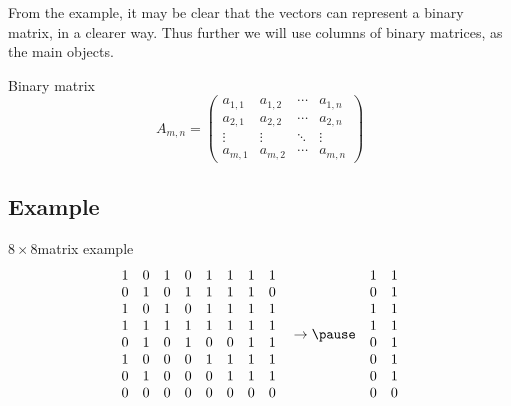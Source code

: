 \documentclass{beamer}
\begin{document}
\begin{frame}
  From the example, it may be clear that the vectors can represent a
  \alert{binary matrix}, in a clearer way. Thus further we will use columns of binary
  matrices, as the main objects.

  \begin{block}{Binary matrix}
    \[
      A_{m,n} =
      \begin{pmatrix}
        a_{1,1} & a_{1,2} & \cdots & a_{1,n} \\
        a_{2,1} & a_{2,2} & \cdots & a_{2,n} \\
        \vdots  & \vdots  & \ddots & \vdots  \\
        a_{m,1} & a_{m,2} & \cdots & a_{m,n}
      \end{pmatrix}
    \]
  \end{block}
\end{frame}

\subsection{Example}

\begin{frame}
  \begin{block}{$8 \times 8$matrix example}
    \[
      \begin{matrix}
        1 & 0 & 1 & 0 & 1 & 1 & 1 & 1 \\
        0 & 1 & 0 & 1 & 1 & 1 & 1 & 0 \\
        1 & 0 & 1 & 0 & 1 & 1 & 1 & 1 \\
        1 & 1 & 1 & 1 & 1 & 1 & 1 & 1 \\
        0 & 1 & 0 & 1 & 0 & 0 & 1 & 1 \\
        1 & 0 & 0 & 0 & 1 & 1 & 1 & 1 \\
        0 & 1 & 0 & 0 & 0 & 1 & 1 & 1 \\
        0 & 0 & 0 & 0 & 0 & 0 & 0 & 0
      \end{matrix} \quad \rightarrow \pause \quad \begin{matrix}
        1 & 1 \\
        0 & 1 \\
        1 & 1 \\
        1 & 1 \\
        0 & 1 \\
        0 & 1 \\
        0 & 1 \\
        0 & 0
      \end{matrix}
    \]
  \end{block}
\end{frame}
\end{document}

